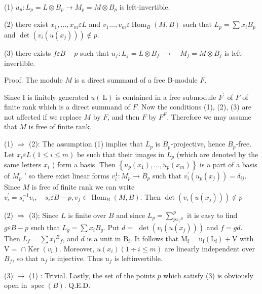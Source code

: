 (1) $u_{p}: L_{p}=L \otimes B_{p} \rightarrow M_{p}=M \otimes B_{p}$ is left-invertible.

(2) there exist $x_{1}, \ldots, x_{m} \varepsilon L$ and $v_{1} \ldots, v_{m} \varepsilon \operatorname{Hom}_{B}(M, B)$ such that $L_{p}=\sum x_{i} B_{p}$ and $\operatorname{det}\left(v_{i}\left(u\left(x_{j}\right)\right)\right) \notin p$.

(3) there exists $f \varepsilon B-p$ such that $u_{f}: L_{f}=L \otimes B_{f}$ $\rightarrow \quad M_{f}=M \otimes B_{f}$ is left-invertible.

Proof. The module $M$ is a direct summand of a free B-module $F$.

Since I is finitely generated $u(\mathrm{~L})$ is contained in a free submodule $F^{\prime}$ of $F$ of finite rank which is a direct summand of $F$. Now the conditions (1), (2), (3) are not affected if we replace $M$ by $F$, and then $F$ by $F^{F}$. Therefore we may assume that $M$ is free of finite rank.

(1) $\Rightarrow$ (2): The assumption (1) implies that $L_{p}$ is $B_{p}$-projective, hence $B_{p}$-free. Let $x_{i} \varepsilon L(1 \leqslant i \leqslant m)$ be such that their images in $L_{p}$ (which are denoted by the same letters $x_{i}$ ) form a basis. Then $\left\{u_{p}\left(x_{1}\right), \ldots, u_{p}\left(x_{m}\right)\right\}$ is a part of a basis of $M_{p}$ ' so there exist linear forms $v_{i}^{1}: M_{p} \rightarrow B_{p}$ such that $v_{i}^{\prime}\left(u_{p}\left(x_{j}\right)\right)=\delta_{i j}$. Since $M$ is free of finite rank we can write $v_{i}^{\prime}=s_{i}^{-1} v_{i}, \quad s_{i} \varepsilon B-p, v_{f} \in \operatorname{Hom}_{B}(M, B) .$ Then $\operatorname{det}\left(v_{i}\left(u\left(x_{j}\right)\right)\right) \notin p$

(2) $\Rightarrow$ (3); Since $L$ is finite over $B$ and since $L_{p}=\sum_{p x_{i}{ }^{B}}^{p}$ it is easy to find $g \varepsilon B-p$ such that $L_{g}=\sum x_{i} B_{g}$. Put $d=$ $\operatorname{det}\left(v_{i}\left(u\left(x_{j}\right)\right)\right)$ and $f=g d$. Then $L_{f}=\sum x_{i}{ }^{B}{ }_{f}$, and $d$ is a unit in $\mathrm{B}_{\mathrm{f}}$. It follows that $\mathrm{M}_{\mathrm{f}}=\mathrm{u}_{\mathrm{f}}\left(\mathrm{L}_{\mathrm{f}}\right)+\mathrm{V}$ with $\mathrm{V}=$ $\cap \operatorname{Ker}\left(v_{i}\right)$. Moreover, $u\left(x_{i}\right)(1 \div i \leqslant m)$ are linearly independent over $B_{f}$, so that $u_{f}$ is injective. Thus $u_{f}$ is leftinvertible.

(3) $\rightarrow$ (1) : Trivial. Lastly, the set of the points $p$ which satisfy (3) is obviously open in $\operatorname{spec}(B)$. Q.E.D.

